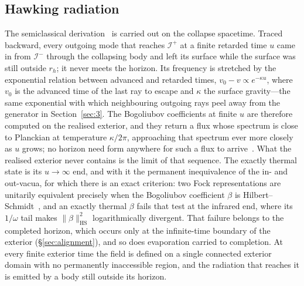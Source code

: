 \documentclass[11pt,a4paper]{article}
\theoremstyle{plain}
\theoremstyle{remark}
\begin{document}
\subsection*{Hawking radiation}
The semiclassical derivation~\cite{Hawking1975} is carried out on the collapse spacetime. Traced backward, every outgoing mode that reaches $\mathscr{I}^+$ at a finite retarded time $u$ came in from $\mathscr{I}^-$ through the collapsing body and left its surface while the surface was still outside $r_h$; it never meets the horizon. Its frequency is stretched by the exponential relation between advanced and retarded times, $v_0-v\propto e^{-\kappa u}$, where $v_0$ is the advanced time of the last ray to escape and $\kappa$ the surface gravity---the same exponential with which neighbouring outgoing rays peel away from the generator in Section~\ref{sec:3}. The Bogoliubov coefficients at finite $u$ are therefore computed on the realised exterior, and they return a flux whose spectrum is close to Planckian at temperature $\kappa/2\pi$, approaching that spectrum ever more closely as $u$ grows; no horizon need form anywhere for such a flux to arrive~\cite{Barcelo2011}. What the realised exterior never contains is the limit of that sequence. The exactly thermal state is its $u\to\infty$ end, and with it the permanent inequivalence of the in- and out-vacua, for which there is an exact criterion: two Fock representations are unitarily equivalent precisely when the Bogoliubov coefficient $\beta$ is Hilbert--Schmidt~\cite{Shale1962}, and an exactly thermal $\beta$ fails that test at the infrared end, where its $1/\omega$ tail makes $\lVert\beta\rVert_{\mathrm{HS}}^{2}$ logarithmically divergent. That failure belongs to the completed horizon, which occurs only at the infinite-time boundary of the exterior (\S\ref{sec:alignment}), and so does evaporation carried to completion. At every finite exterior time the field is defined on a single connected exterior domain with no permanently inaccessible region, and the radiation that reaches it is emitted by a body still outside its horizon.
\end{document}
